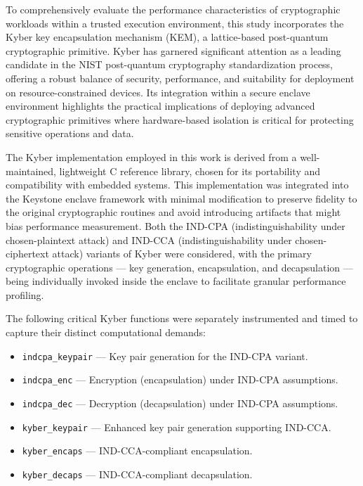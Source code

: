 To comprehensively evaluate the performance characteristics of cryptographic workloads within a trusted execution environment, this study incorporates the Kyber key encapsulation mechanism (KEM), a lattice-based post-quantum cryptographic primitive. Kyber has garnered significant attention as a leading candidate in the NIST post-quantum cryptography standardization process, offering a robust balance of security, performance, and suitability for deployment on resource-constrained devices. Its integration within a secure enclave environment highlights the practical implications of deploying advanced cryptographic primitives where hardware-based isolation is critical for protecting sensitive operations and data.

The Kyber implementation employed in this work is derived from a well-maintained, lightweight C reference library, chosen for its portability and compatibility with embedded systems. This implementation was integrated into the Keystone enclave framework with minimal modification to preserve fidelity to the original cryptographic routines and avoid introducing artifacts that might bias performance measurement. Both the IND-CPA (indistinguishability under chosen-plaintext attack) and IND-CCA (indistinguishability under chosen-ciphertext attack) variants of Kyber were considered, with the primary cryptographic operations — key generation, encapsulation, and decapsulation — being individually invoked inside the enclave to facilitate granular performance profiling.

The following critical Kyber functions were separately instrumented and timed to capture their distinct computational demands:

\begin{itemize}
    \item \texttt{indcpa\_keypair} — Key pair generation for the IND-CPA variant.
    \item \texttt{indcpa\_enc} — Encryption (encapsulation) under IND-CPA assumptions.
    \item \texttt{indcpa\_dec} — Decryption (decapsulation) under IND-CPA assumptions.
    \item \texttt{kyber\_keypair} — Enhanced key pair generation supporting IND-CCA.
    \item \texttt{kyber\_encaps} — IND-CCA-compliant encapsulation.
    \item \texttt{kyber\_decaps} — IND-CCA-compliant decapsulation.
\end{itemize}

